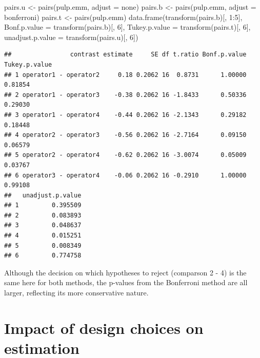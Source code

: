 \documentclass[
]{book}
\newenvironment{Shaded}{\begin{snugshade}}{\end{snugshade}}
\newcommand{\AttributeTok}[1]{\textcolor[rgb]{0.77,0.63,0.00}{#1}}
\newcommand{\DecValTok}[1]{\textcolor[rgb]{0.00,0.00,0.81}{#1}}
\newcommand{\FunctionTok}[1]{\textcolor[rgb]{0.00,0.00,0.00}{#1}}
\newcommand{\NormalTok}[1]{#1}
\newcommand{\OtherTok}[1]{\textcolor[rgb]{0.56,0.35,0.01}{#1}}
\newcommand{\SpecialCharTok}[1]{\textcolor[rgb]{0.00,0.00,0.00}{#1}}
\newcommand{\StringTok}[1]{\textcolor[rgb]{0.31,0.60,0.02}{#1}}
\theoremstyle{definition}
\theoremstyle{definition}
\theoremstyle{definition}
\theoremstyle{definition}
\theoremstyle{remark}
\begin{document}
\begin{Shaded}
\begin{Highlighting}[]
\NormalTok{pairs.u }\OtherTok{\textless{}{-}} \FunctionTok{pairs}\NormalTok{(pulp.emm, }\AttributeTok{adjust =} \StringTok{\textquotesingle{}none\textquotesingle{}}\NormalTok{)}
\NormalTok{pairs.b }\OtherTok{\textless{}{-}} \FunctionTok{pairs}\NormalTok{(pulp.emm, }\AttributeTok{adjust =} \StringTok{\textquotesingle{}bonferroni\textquotesingle{}}\NormalTok{)}
\NormalTok{pairs.t }\OtherTok{\textless{}{-}} \FunctionTok{pairs}\NormalTok{(pulp.emm)}
\FunctionTok{data.frame}\NormalTok{(}\FunctionTok{transform}\NormalTok{(pairs.b)[, }\DecValTok{1}\SpecialCharTok{:}\DecValTok{5}\NormalTok{], }\AttributeTok{Bonf.p.value =} \FunctionTok{transform}\NormalTok{(pairs.b)[, }\DecValTok{6}\NormalTok{], }\AttributeTok{Tukey.p.value =} \FunctionTok{transform}\NormalTok{(pairs.t)[, }\DecValTok{6}\NormalTok{], }\AttributeTok{unadjust.p.value =} \FunctionTok{transform}\NormalTok{(pairs.u)[, }\DecValTok{6}\NormalTok{])}
\end{Highlighting}
\end{Shaded}

\begin{verbatim}
##                contrast estimate     SE df t.ratio Bonf.p.value Tukey.p.value
## 1 operator1 - operator2     0.18 0.2062 16  0.8731      1.00000       0.81854
## 2 operator1 - operator3    -0.38 0.2062 16 -1.8433      0.50336       0.29030
## 3 operator1 - operator4    -0.44 0.2062 16 -2.1343      0.29182       0.18448
## 4 operator2 - operator3    -0.56 0.2062 16 -2.7164      0.09150       0.06579
## 5 operator2 - operator4    -0.62 0.2062 16 -3.0074      0.05009       0.03767
## 6 operator3 - operator4    -0.06 0.2062 16 -0.2910      1.00000       0.99108
##   unadjust.p.value
## 1         0.395509
## 2         0.083893
## 3         0.048637
## 4         0.015251
## 5         0.008349
## 6         0.774758
\end{verbatim}

Although the decision on which hypotheses to reject (comparson 2 - 4) is the same here for both methods, the p-values from the Bonferroni method are all larger, reflecting its more conservative nature.

\hypertarget{impact-of-design-choices-on-estimation}{%
\section{Impact of design choices on estimation}\label{impact-of-design-choices-on-estimation}}
\end{document}

